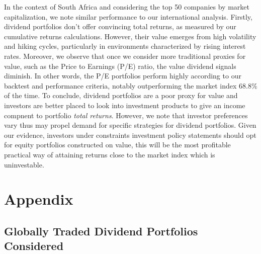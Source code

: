 \documentclass[10pt,preprint, authoryear]{elsarticle}
\numberwithin{equation}{section}
\numberwithin{figure}{section}
\numberwithin{table}{section}
\begin{document}
In the context of South Africa and considering the top 50 companies by
market capitalization, we note similar performance to our international
analysis. Firstly, dividend portfolios don't offer convincing total
returns, as measured by our cumulative returns calculations. However,
their value emerges from high volatility and hiking cycles, particularly
in environments characterized by rising interest rates. Moreover, we
observe that once we consider more traditional proxies for value, such
as the Price to Earnings (P/E) ratio, the value dividend signals
diminish. In other words, the P/E portfolios perform highly according to
our backtest and performance criteria, notably outperforming the market
index 68.8\% of the time. To conclude, dividend portfolios are a poor
proxy for value and investors are better placed to look into investment
products to give an income compnent to portfolio \emph{total returns}.
However, we note that investor preferences vary thus may propel demand
for specific strategies for dividend portfolios. Given our evidence,
investors under constraints investment policy statements should opt for
equity portfolios constructed on value, this will be the most profitable
practical way of attaining returns close to the market index which is
uninvestable.

\newpage

\hypertarget{appendix}{%
\section*{Appendix}\label{appendix}}

\hypertarget{globally-traded-dividend-portfolios-considered}{%
\subsection{Globally Traded Dividend Portfolios
Considered}\label{globally-traded-dividend-portfolios-considered}}
\end{document}
